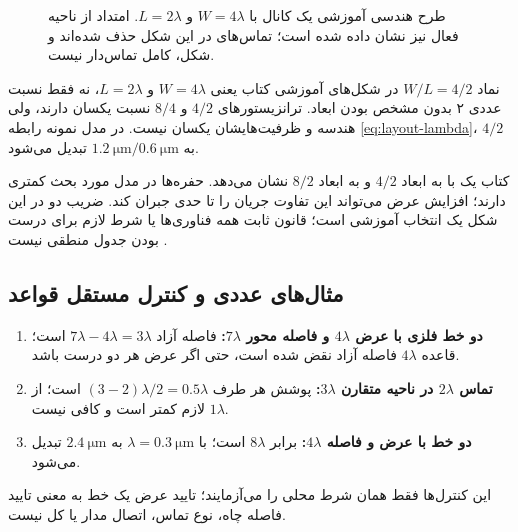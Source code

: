 \begin{figure}[ht]
\centering
\begin{latin}
\PersianMathDigits
{}
\end{latin}
\caption{طرح هندسی آموزشی یک کانال با \(W=4\lambda\) و \(L=2\lambda\).
امتداد  از ناحیه فعال نیز نشان داده شده است؛ تماس‌های 
در این شکل حذف شده‌اند و شکل،  کامل تماس‌دار نیست.}
\label{fig:layout-wl}
\end{figure}

نماد \(W/L=4/2\) در شکل‌های آموزشی کتاب یعنی \(W=4\lambda\) و
\(L=2\lambda\)، نه فقط نسبت عددی ۲ بدون مشخص بودن ابعاد.
ترانزیستورهای \(4/2\) و \(8/4\) نسبت یکسان دارند، ولی هندسه و ظرفیت‌هایشان
یکسان نیست. در مدل نمونه رابطه \eqref{eq:layout-lambda}،
\(4/2\) به \(\qty{1.2}{\micro\metre}/\qty{0.6}{\micro\metre}\) تبدیل می‌شود.

کتاب یک  با  به ابعاد \(4/2\) و 
به ابعاد \(8/2\) نشان می‌دهد. حفره‌ها در مدل مورد بحث 
کمتری دارند؛ افزایش عرض  می‌تواند این تفاوت جریان را تا حدی جبران کند.
ضریب دو در این شکل یک انتخاب آموزشی است؛ قانون ثابت همه فناوری‌ها یا شرط لازم
برای درست بودن جدول منطقی  نیست
\cite[شکل ]{weste}.

\subsection{مثال‌های عددی و کنترل مستقل قواعد}
\begin{enumerate}
\item \textbf{دو خط فلزی با عرض \(4\lambda\) و فاصله محور \(7\lambda\):}
فاصله آزاد \(7\lambda-4\lambda=3\lambda\) است؛
قاعده \(4\lambda\) فاصله آزاد نقض شده است، حتی اگر عرض هر دو درست باشد.
\item \textbf{تماس \(2\lambda\) در ناحیه متقارن \(3\lambda\):}
پوشش هر طرف \((3-2)\lambda/2=0.5\lambda\) است؛
از \(1\lambda\) لازم کمتر است و کافی نیست.
\item \textbf{دو خط با عرض و فاصله \(4\lambda\):}
 برابر \(8\lambda\) است؛ با \(\lambda=\qty{0.3}{\micro\metre}\)
به \(\qty{2.4}{\micro\metre}\) تبدیل می‌شود.
\end{enumerate}
این کنترل‌ها فقط همان شرط محلی را می‌آزمایند؛ تایید عرض یک خط به معنی
تایید فاصله چاه، نوع تماس، اتصال مدار یا کل  نیست.
